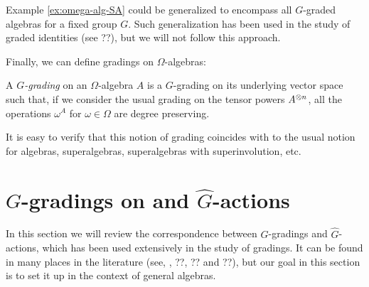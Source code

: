 \begin{remark}
    Example \ref{ex:omega-alg-SA} could be generalized to encompass all $G$-graded algebras for a fixed group $G$. 
    Such generalization has been used in the study of graded identities (see ??), but we will not follow this approach.
\end{remark}

Finally, we can define gradings on $\Omega$-algebras:

\begin{defi}\label{def:grds-on-Omega-algebras}
    A \emph{$G$-grading} on an $\Omega$-algebra $A$ is a $G$-grading on its underlying vector space such that, if we consider the usual grading on the tensor powers $A^{\otimes n}$, all the operations $\omega^A$ for $\omega \in \Omega$ are degree preserving.
\end{defi}

It is easy to verify that this notion of grading coincides with to the usual notion for algebras, superalgebras, superalgebras with superinvolution, etc.



\section{$G$-gradings on  and $\widehat G$-actions}

In this section we will review the correspondence between $G$-gradings and $\widehat G$-actions, which has been used extensively in the study of gradings. 
It can be found in many places in the literature (see, \eg, ??, ?? and ??), but our goal in this section is to set it up in the context of general algebras. 

